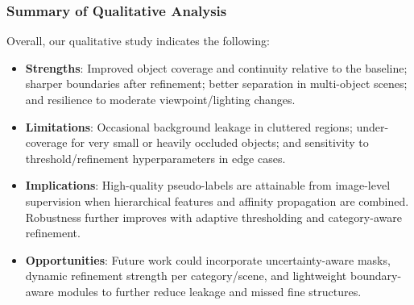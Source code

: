 \subsubsection{Summary of Qualitative Analysis}
\label{subsubsec:qualitative_summary}
Overall, our qualitative study indicates the following:
\begin{itemize}
  \item \textbf{Strengths}: Improved object coverage and continuity relative to the baseline; sharper boundaries after refinement; better separation in multi-object scenes; and resilience to moderate viewpoint/lighting changes.
  \item \textbf{Limitations}: Occasional background leakage in cluttered regions; under-coverage for very small or heavily occluded objects; and sensitivity to threshold/refinement hyperparameters in edge cases.
  \item \textbf{Implications}: High-quality pseudo-labels are attainable from image-level supervision when hierarchical features and affinity propagation are combined. Robustness further improves with adaptive thresholding and category-aware refinement.
  \item \textbf{Opportunities}: Future work could incorporate uncertainty-aware masks, dynamic refinement strength per category/scene, and lightweight boundary-aware modules to further reduce leakage and missed fine structures.
\end{itemize}





